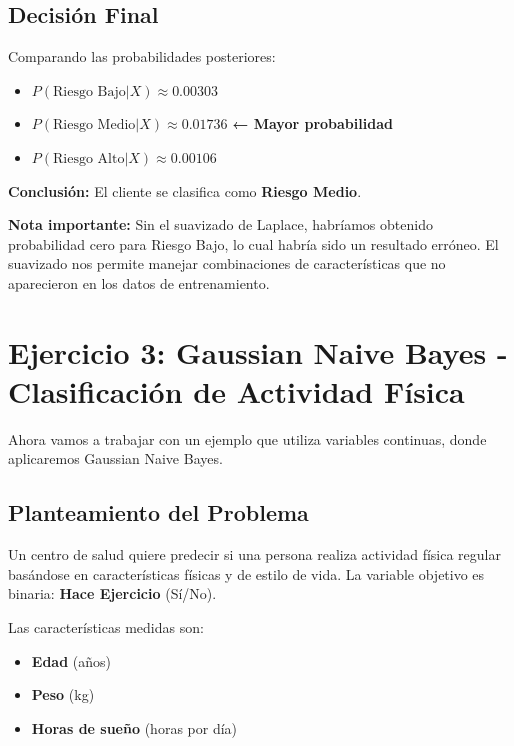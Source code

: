 \documentclass[12pt]{article}
\begin{document}
\subsection{Decisión Final}
Comparando las probabilidades posteriores:
\begin{itemize}
    \item $P(\text{Riesgo Bajo}|X) \approx 0.00303$
    \item $P(\text{Riesgo Medio}|X) \approx 0.01736$ \textbf{← Mayor probabilidad}
    \item $P(\text{Riesgo Alto}|X) \approx 0.00106$
\end{itemize}

\textbf{Conclusión:} El cliente se clasifica como \textbf{Riesgo Medio}.

\vspace{0.5em}

\textbf{Nota importante:} Sin el suavizado de Laplace, habríamos obtenido probabilidad cero para Riesgo Bajo, lo cual habría sido un resultado erróneo. El suavizado nos permite manejar combinaciones de características que no aparecieron en los datos de entrenamiento.

\section{Ejercicio 3: Gaussian Naive Bayes - Clasificación de Actividad Física}
Ahora vamos a trabajar con un ejemplo que utiliza variables continuas, donde aplicaremos Gaussian Naive Bayes.

\subsection{Planteamiento del Problema}
Un centro de salud quiere predecir si una persona realiza actividad física regular basándose en características físicas y de estilo de vida. La variable objetivo es binaria: \textbf{Hace Ejercicio} (Sí/No).

Las características medidas son:
\begin{itemize}
    \item \textbf{Edad} (años)
    \item \textbf{Peso} (kg)
    \item \textbf{Horas de sueño} (horas por día)
\end{itemize}
\end{document}
